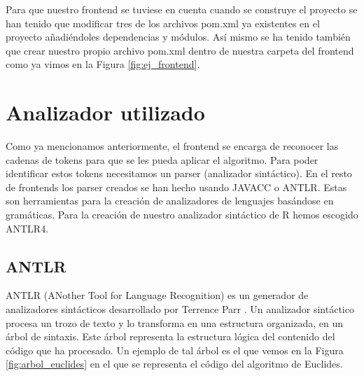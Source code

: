 Para que nuestro frontend se tuviese en cuenta cuando se construye el proyecto se han tenido que modificar tres de los archivos pom.xml ya existentes en el proyecto añadiéndoles dependencias y módulos.
\newline
Así mismo se ha tenido también que crear nuestro propio archivo pom.xml dentro de nuestra carpeta del frontend como ya vimos en la Figura \ref{fig:ej_frontend}.

\section{Analizador utilizado}

Como ya mencionamos anteriormente, el frontend se encarga de reconocer las cadenas de tokens para que se les pueda aplicar el algoritmo. Para poder identificar estos tokens necesitamos un parser (analizador sintáctico).
\newline
En el resto de frontends los parser creados se han hecho usando JAVACC o ANTLR.
\newline
Estas son herramientas para la creación de analizadores de lenguajes basándose en gramáticas.
Para la creación de nuestro analizador sintáctico de R hemos escogido ANTLR4.



\subsection{ANTLR}
ANTLR (ANother Tool for Language Recognition) es un generador de analizadores sintácticos desarrollado por Terrence Parr \cite{antlr_libro}. 
\newline
Un analizador sintáctico procesa un trozo de texto y lo transforma en una estructura organizada, en un árbol de sintaxis. Este árbol representa la estructura lógica del contenido del código que ha procesado. Un ejemplo de tal árbol es el que vemos en la Figura \ref{fig:arbol_euclides} en el que se representa el código del algoritmo de Euclides.


